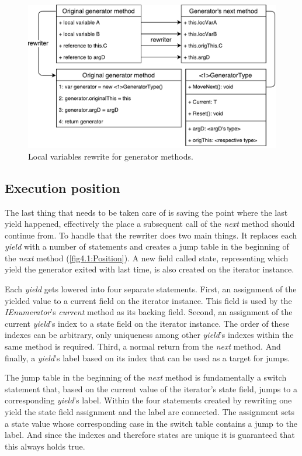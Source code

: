 \begin{figure}[h]
	\centering	
	\includegraphics[scale=0.70]{../img/4_1_localVars}	
	\caption{Local variables rewrite for generator methods.}
	\label{fig4.1:LocVars}
\end{figure}

\subsection{Execution position}

The last thing that needs to be taken care of is saving the point where the last yield happened, effectively the place a subsequent call of the \emph{next} method should continue from. To handle that the rewriter does two main things. It replaces each \emph{yield} with a number of statements and creates a jump table in the beginning of the \emph{next} method (\autoref{fig4.1:Position}). A new field called state, representing which yield the generator exited with last time, is also created on the iterator instance.

Each \emph{yield} gets lowered into four separate statements. First, an assignment of the yielded value to a current field on the iterator instance. This field is used by the \emph{IEnumerator}'s \emph{current} method as its backing field. Second, an assignment of the current \emph{yield}’s index to a state field on the iterator instance. The order of these indexes can be arbitrary, only uniqueness among other \emph{yield}’s indexes within the same method is required. Third, a normal return from the \emph{next} method. And finally, a \emph{yield}’s label based on its index that can be used as a target for jumps.

The jump table in the beginning of the \emph{next} method is fundamentally a switch statement that, based on the current value of the iterator’s state field, jumps to a corresponding \emph{yield}'s label. Within the four statements created by rewriting one yield the state field assignment and the label are connected. The assignment sets a state value whose corresponding case in the switch table contains a jump to the label. And since the indexes and therefore states are unique it is guaranteed that this always holds true.

